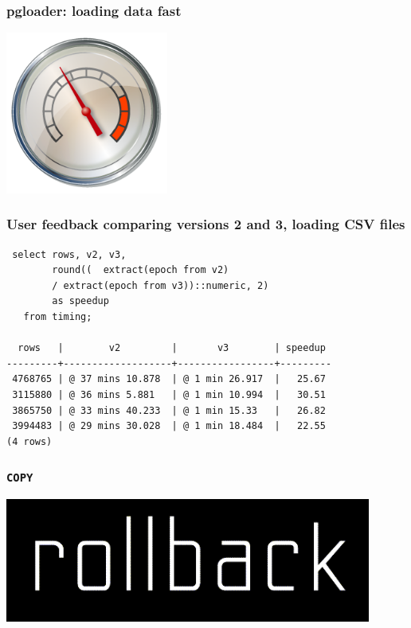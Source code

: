 \documentclass{beamer}
\begin{document}
\begin{frame}
  \frametitle{pgloader: loading data \textbf{fast}}

  \begin{center}
    \includegraphics[height=2.1in]{performance-index-00.png}
  \end{center}
\end{frame}

\begin{frame}[fragile]
  \frametitle{User feedback comparing versions 2 and 3, loading CSV files}

  \begin{verbatim}
 select rows, v2, v3,
        round((  extract(epoch from v2)
        / extract(epoch from v3))::numeric, 2)
        as speedup
   from timing;
        
  rows   |        v2         |       v3        | speedup 
---------+-------------------+-----------------+---------
 4768765 | @ 37 mins 10.878  | @ 1 min 26.917  |   25.67
 3115880 | @ 36 mins 5.881   | @ 1 min 10.994  |   30.51
 3865750 | @ 33 mins 40.233  | @ 1 min 15.33   |   26.82
 3994483 | @ 29 mins 30.028  | @ 1 min 18.484  |   22.55
(4 rows)
  \end{verbatim}
\end{frame}

\begin{frame}
  \frametitle{\texttt{COPY}}

  
  \begin{center}
    \includegraphics[height=1.6in]{rollback-wordmark.png}
  \end{center}
\end{frame}
\end{document}
